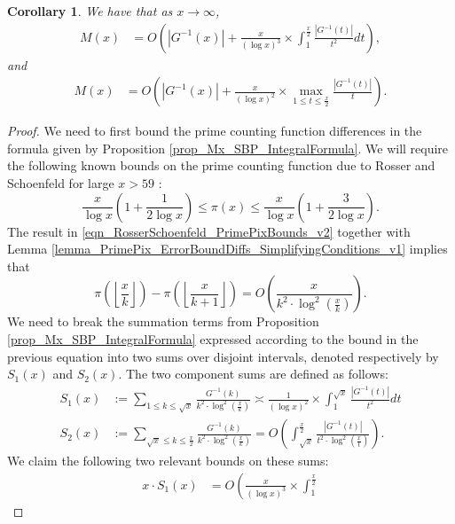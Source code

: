 \documentclass[11pt,reqno,a4letter]{article}
\numberwithin{figure}{section}
\numberwithin{table}{section}
\newcommand{\Floor}[2]{\ensuremath{\left\lfloor \frac{#1}{#2} \right\rfloor}}
\theoremstyle{plain}
\newtheorem{cor}[theorem]{Corollary}
\numberwithin{theorem}{section}
\theoremstyle{definition}
\begin{document}
\begin{cor} 
\label{cor_IntFormulaGInvx_for_Mx_v1} 
We have that as $x \rightarrow \infty$, 
\begin{align*}
M(x) & = O\left(|G^{-1}(x)| + \frac{x}{(\log x)^3} \times \int_{1}^{\frac{x}{2}} \frac{|G^{-1}(t)|}{t^2} dt\right), 
\end{align*} 
and 
\begin{align*} 
M(x) & = O\left(|G^{-1}(x)| + \frac{x}{(\log x)^2} \times \max_{1 \leq t \leq \frac{x}{2}} 
     \frac{|G^{-1}(t)|}{t}\right). 
\end{align*}
\end{cor}
\begin{proof}
We need to first bound the prime counting function differences in the formula given by 
Proposition \ref{prop_Mx_SBP_IntegralFormula}. 
We will require the following known bounds on the prime counting 
function due to Rosser and Schoenfeld for large $x > 59$ 
\cite[Thm.\ 1]{ROSSER-SCHOENFELD-1962}: 
\begin{equation} 
\label{eqn_RosserSchoenfeld_PrimePixBounds_v2} 
\frac{x}{\log x}\left(1 + \frac{1}{2\log x}\right) \leq \pi(x) \leq 
     \frac{x}{\log x}\left(1 + \frac{3}{2 \log x}\right). 
\end{equation} 
The result in \eqref{eqn_RosserSchoenfeld_PrimePixBounds_v2} together with 
Lemma \ref{lemma_PrimePix_ErrorBoundDiffs_SimplifyingConditions_v1} implies that 
\[
\pi\left(\Floor{x}{k}\right) - \pi\left(\Floor{x}{k+1}\right) = 
     O\left(\frac{x}{k^2 \cdot \log^2\left(\frac{x}{k}\right)}\right). 
\]
We need to break the summation terms from Proposition \ref{prop_Mx_SBP_IntegralFormula} 
expressed according to the bound in the previous equation into two sums over 
disjoint intervals, denoted respectively by $S_1(x)$ and $S_2(x)$. 
The two component sums are defined as follows: 
\begin{align*} 
S_1(x) & := \sum_{1 \leq k \leq \sqrt{x}} \frac{G^{-1}(k)}{k^2 \cdot \log^2\left(\frac{x}{k}\right)} 
     \asymp 
     \frac{1}{(\log x)^2} \times \int_1^{\sqrt{x}} \frac{|G^{-1}(t)|}{t^2} dt \\ 
S_2(x) & := \sum_{\sqrt{x} \leq k \leq \frac{x}{2}} 
     \frac{G^{-1}(k)}{k^2 \cdot \log^2\left(\frac{x}{k}\right)} 
     = O\left(\int_{\sqrt{x}}^{\frac{x}{2}} \frac{|G^{-1}(t)|}{t^2 \cdot 
     \log^2\left(\frac{x}{t}\right)}\right). 
\end{align*} 
We claim the following two relevant bounds on these sums: 
\begin{align*} 
\tag{A} 
x \cdot S_1(x) & = O\left(\frac{x}{(\log x)^3} \times \int_{1}^{\frac{x}{2}} 

\end{align*}
\end{proof}
\end{document}
